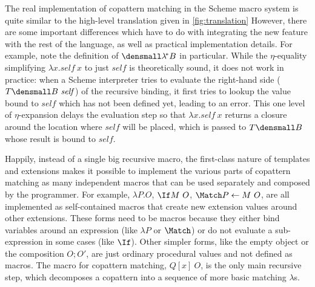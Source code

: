 The real implementation of copattern matching in the Scheme macro system is quite similar to the high-level translation given in \cref{fig:translation}
However, there are some important differences which have to do with integrating the new feature with the rest of the language, as well as practical implementation details.
For example, note the definition of $\den{\lamstar B}$ in particular.
While the $\eta$-equality simplifying $\lambda x. \mathit{self} ~ x$ to just $\mathit{self}$ is theoretically sound, it does not work in practice:
when a Scheme interpreter tries to evaluate the right-hand side ($T\den{B}~\mathit{self}$) of the recursive binding, it first tries to lookup the value bound to $\mathit{self}$ which has not been defined yet, leading to an error.
This one level of $\eta$-expansion delays the evaluation step so that $\lambda x. \mathit{self} ~ x$ returns a closure around the location where $\mathit{self}$ will be placed, which is passed to $T\den{B}$ whose result is bound to $\mathit{self}$.

Happily, instead of a single big recursive macro, the first-class nature of templates and extensions makes it possible to implement the various parts of copattern matching as many independent macros that can be used separately and composed by the programmer. 
For example, $\lambda P. O$, $\If M ~ O$, $\Match P \gets M ~ O$, \etc are all implemented as self-contained macros that create new extension values around other extensions.
These forms need to be macros because they either bind variables around an expression (like $\lambda P$ or $\Match$) or do not evaluate a sub-expression in some cases (like $\If$).
Other simpler forms, like the empty object or the composition $O; O'$, are just ordinary procedural values and not defined as macros.
The macro for copattern matching, $Q[x]~O$, is the only main recursive step, which decomposes a copattern into a sequence of more basic matching $\lambda$s.

